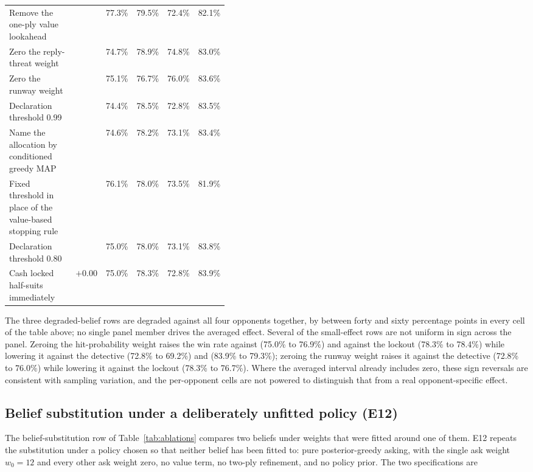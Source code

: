 {\begin{longtable}{@{}p{0.42\linewidth}rrrrr@{}}
Remove the one-ply value lookahead & \numAblValue{} & 77.3\% & 79.5\% & 72.4\% & 82.1\% \\
Zero the reply-threat weight & \numAblThreat{} & 74.7\% & 78.9\% & 74.8\% & 83.0\% \\
Zero the runway weight & \numAblRunway{} & 75.1\% & 76.7\% & 76.0\% & 83.6\% \\
\midrule
Declaration threshold 0.99 & \numAblDeclNinetyNine{} & 74.4\% & 78.5\% & 72.8\% & 83.5\% \\
Name the allocation by conditioned greedy MAP & \numAblGmap{} & 74.6\% & 78.2\% & 73.1\% & 83.4\% \\
Fixed threshold in place of the value-based stopping rule & \numAblStop{} & 76.1\% & 78.0\% & 73.5\% & 81.9\% \\
Declaration threshold 0.80 & \numAblDeclEighty{} & 75.0\% & 78.0\% & 73.1\% & 83.8\% \\
Cash locked half-suits immediately & $+0.00$ & 75.0\% & 78.3\% & 72.8\% & 83.9\% \\
\bottomrule
\end{longtable}
}

The three degraded-belief rows are degraded against all four opponents
together, by between forty and sixty percentage points in every cell of the
table above; no single panel member drives the averaged effect. Several of the
small-effect rows are not uniform
in sign across the panel. Zeroing the hit-probability weight raises the win rate
against \vthree{} (75.0\% to 76.9\%) and against the lockout (78.3\% to 78.4\%)
while lowering it against the detective (72.8\% to 69.2\%) and \vtwo{} (83.9\%
to 79.3\%); zeroing the runway weight raises it against the detective (72.8\% to
76.0\%) while lowering it against the lockout (78.3\% to 76.7\%). Where the
averaged interval already includes zero, these sign reversals are consistent
with sampling variation, and the per-opponent cells are not powered to
distinguish that from a real opponent-specific effect.

\subsection{Belief substitution under a deliberately unfitted policy (E12)}
\label{app:abl-e12}

The belief-substitution row of Table~\ref{tab:ablations} compares two beliefs
under weights that were fitted around one of them. E12 repeats the substitution
under a policy chosen so that neither belief has been fitted to: pure
posterior-greedy asking, with the single ask weight $w_0 = 12$ and every other
ask weight zero, no value term, no two-ply refinement, and no policy prior. The
two specifications are

